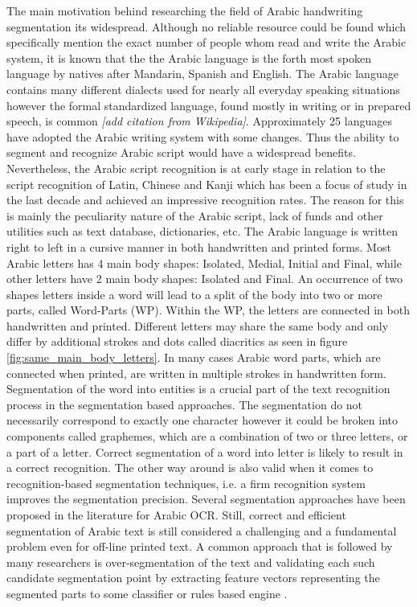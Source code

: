 \documentclass[journal,compsoc]{IEEEtran}
\begin{document}
The main motivation behind researching the field of Arabic handwriting segmentation its widespread. Although no reliable resource could be found which specifically mention the exact number of people whom read and write the Arabic system, it is known that the the Arabic language is the forth most spoken language by natives after Mandarin, Spanish and English. The Arabic language contains many different dialects used for nearly all everyday speaking situations however the formal standardized language, found mostly in writing or in prepared speech, is common \emph{[add citation from Wikipedia]}.  Approximately 25 languages have adopted the Arabic writing system with some changes. Thus the ability to segment and recognize Arabic script would have a widespread benefits. Nevertheless, the Arabic script recognition is at early stage in relation to the script recognition of Latin, Chinese and Kanji which has been a focus of study in the last decade and achieved an impressive recognition rates. The reason for this is mainly the peculiarity nature of the Arabic script, lack of funds and other utilities such as text database, dictionaries, etc. \cite{zeki2011segmentation}
The Arabic language is written right to left in a cursive manner in both handwritten and printed forms. Most Arabic letters has 4 main body shapes: Isolated, Medial, Initial and Final, while other letters have 2 main body shapes: Isolated and Final. An occurrence of two shapes letters inside a word will lead to a split of the body into two or more parts, called Word-Parts (WP). Within the WP, the letters are connected in both handwritten and printed. Different letters may share the same body and only differ by additional strokes and dots called diacritics as seen in figure \ref{fig:same_main_body_letters}. In many cases Arabic word parts, which are connected when printed, are written in multiple strokes in handwritten form.\\  

Segmentation of the word into entities is a crucial part of the text recognition process in the segmentation based approaches. The segmentation do not necessarily correspond to exactly one character however it could be broken into components called graphemes, which are a combination of two or three letters, or a part of a letter. Correct segmentation of a word into letter is likely to result in a correct recognition. The other way around is also valid when it comes to recognition-based segmentation techniques, i.e. a firm recognition system improves the segmentation precision. Several segmentation approaches have been proposed in the literature for Arabic OCR. Still, correct and efficient segmentation of Arabic text is still considered a challenging and a fundamental problem even for off-line printed text. A common approach that is followed by many researchers is over-segmentation of the text and validating each such candidate segmentation point by extracting feature vectors representing the segmented parts to some classifier or rules based engine \cite{daifallah2009recognition}.\\
\end{document}
